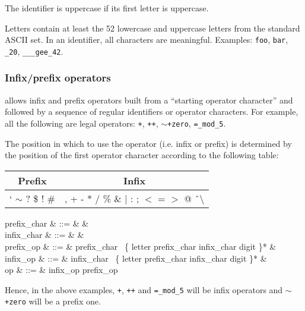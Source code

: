 The identifier is uppercase if its first letter is uppercase.

Letters contain at least the 52 lowercase and uppercase
letters from the standard ASCII set. In an identifier, all characters
are meaningful.
Examples: {\tt foo}, {\tt bar}, {\tt \_20}, {\tt \_\_\_gee\_42}.

\subsubsection{Infix/prefix operators}

{\focal} allows infix and prefix operators built from a
``starting operator character'' and followed by a sequence of
regular identifiers or operator characters. For example, all the
following are legal operators:
{\tt +}, {\tt ++}, {\tt $\sim$+zero}, {\tt =\_mod\_5}.

The position in which to use the operator (i.e. infix or prefix)
is determined by the position of the first operator character
according to the following table:
\begin{center}
\begin{tabular}{|c|c|}
\hline
Prefix & Infix \\
\hline
` $\sim$ ? \$ ! \# &
, + - * / \% \& $|$ : ; $<$ = $>$ @ \^\ $\setminus$ \\
\hline
\end{tabular}
\end{center}

\begin{syntax}
prefix\_char & ::= & & \\
 infix\_char & ::= &
     & \\
  prefix\_op & ::= & prefix\_char
    \ \{ letter \mid prefix\_char \mid infix\_char
    \mid digit \mid \terminal{\_} \}* & \\
   infix\_op & ::= & infix\_char
    \ \{ letter \mid prefix\_char \mid infix\_char
    \mid digit \mid \terminal{\_} \}* & \\
          op & ::= & infix\_op \mid prefix\_op
\end{syntax}

Hence, in the above examples, {\tt +}, {\tt ++} and {\tt =\_mod\_5} will be
infix operators and {\tt $\sim$+zero} will be a prefix one.

